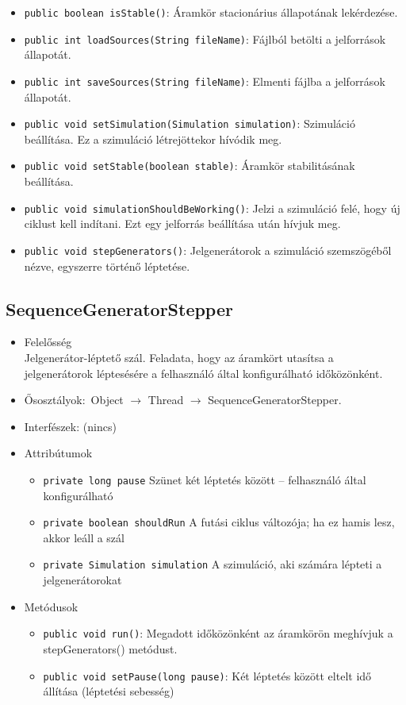 \begin{itemize}
\begin{itemize}
	\item \texttt{public boolean isStable()}: Áramkör stacionárius állapotának lekérdezése.
	\item \texttt{public int loadSources(String fileName)}: Fájlból betölti a jelforrások állapotát.
	\item \texttt{public int saveSources(String fileName)}: Elmenti fájlba a jelforrások állapotát.
	\item \texttt{public void setSimulation(Simulation simulation)}: Szimuláció beállítása. Ez a szimuláció létrejöttekor hívódik meg.
	\item \texttt{public void setStable(boolean stable)}: Áramkör stabilitásának beállítása.
	\item \texttt{public void simulationShouldBeWorking()}: Jelzi a szimuláció felé, hogy új ciklust kell indítani. Ezt egy jelforrás  beállítása után hívjuk meg.
	\item \texttt{public void stepGenerators()}: Jelgenerátorok a szimuláció szemszögéből nézve, egyszerre történő  léptetése.
\end{itemize}
\end{itemize}

\subsection{SequenceGeneratorStepper}
\begin{itemize}
\item Felelősség\\
Jelgenerátor-léptető szál. Feladata, hogy az áramkört utasítsa a jelgenerátorok léptesésére  a felhasználó által konfigurálható időközönként.
\item Ősosztályok:\ Object $\rightarrow{}$ Thread $\rightarrow{}$ SequenceGeneratorStepper.
\item Interfészek: (nincs)
\item Attribútumok $\ $
\begin{itemize}
	\item \texttt{private long pause} Szünet két léptetés között -- felhasználó által konfigurálható
	\item \texttt{private boolean shouldRun} A futási ciklus változója; ha ez hamis lesz, akkor leáll a szál
	\item \texttt{private Simulation simulation} A szimuláció, aki számára lépteti a jelgenerátorokat
\end{itemize}
\item Metódusok$\ $
\begin{itemize}
	\item \texttt{public void run()}: Megadott időközönként az áramkörön meghívjuk a stepGenerators() metódust.
	\item \texttt{public void setPause(long pause)}: Két léptetés között eltelt idő állítása (léptetési sebesség)
\end{itemize}
\end{itemize}


